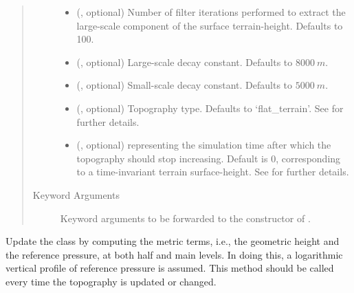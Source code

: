 \documentclass[letterpaper,10pt,english]{sphinxmanual}
\begin{document}
\begin{fulllineitems}
\begin{fulllineitems}
\begin{quote}
\begin{description}
\begin{itemize}
\item {} 
 (, optional) \textendash{} Number of filter iterations performed to extract the large-scale component of the surface terrain-height.
Defaults to 100.

\item {} 
 (, optional) \textendash{} Large-scale decay constant. Defaults to \(8000 ~ m\).

\item {} 
 (, optional) \textendash{} Small-scale decay constant. Defaults to \(5000 ~ m\).

\item {} 
 (, optional) \textendash{} Topography type. Defaults to ‘flat\_terrain’. See {\hyperref[\detokenize{api:module-grids.topography}]{}} for further details.

\item {} 
 (, optional) \textendash{}  representing the simulation time after which the topography should stop
increasing. Default is 0, corresponding to a time-invariant terrain surface-height. See {\hyperref[\detokenize{api:module-grids.topography}]{}}
for further details.

\end{itemize}

\item[{Keyword Arguments}] \leavevmode
{} \textendash{} Keyword arguments to be forwarded to the constructor of {\hyperref[\detokenize{api:grids.topography.Topography1d}]{}}.

\end{description}\end{quote}

\end{fulllineitems}


\begin{fulllineitems}
\label{\detokenize{api:grids.sleve.SLEVE2d._update_metric_terms}}
Update the class by computing the metric terms, i.e., the geometric height and the reference pressure,
at both half and main levels. In doing this, a logarithmic vertical profile of reference pressure is assumed.
This method should be called every time the topography is updated or changed.


\end{fulllineitems}
\end{fulllineitems}
\end{document}
